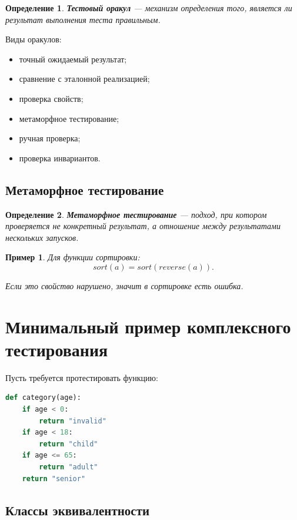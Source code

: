 \documentclass[12pt,a4paper]{article}
\newtheorem{definition}{Определение}
\newtheorem{example}{Пример}
\begin{document}
\begin{definition}
\textbf{Тестовый оракул} --- механизм определения того, является ли результат выполнения теста правильным.
\end{definition}

Виды оракулов:

\begin{itemize}
    \item точный ожидаемый результат;
    \item сравнение с эталонной реализацией;
    \item проверка свойств;
    \item метаморфное тестирование;
    \item ручная проверка;
    \item проверка инвариантов.
\end{itemize}

\subsection{Метаморфное тестирование}

\begin{definition}
\textbf{Метаморфное тестирование} --- подход, при котором проверяется не конкретный результат, а отношение между результатами нескольких запусков.
\end{definition}

\begin{example}
Для функции сортировки:
\[
sort(a) = sort(reverse(a)).
\]

Если это свойство нарушено, значит в сортировке есть ошибка.
\end{example}

\section{Минимальный пример комплексного тестирования}

Пусть требуется протестировать функцию:

\begin{lstlisting}[language=Python]
def category(age):
    if age < 0:
        return "invalid"
    if age < 18:
        return "child"
    if age <= 65:
        return "adult"
    return "senior"
\end{lstlisting}

\subsection{Классы эквивалентности}
\end{document}
